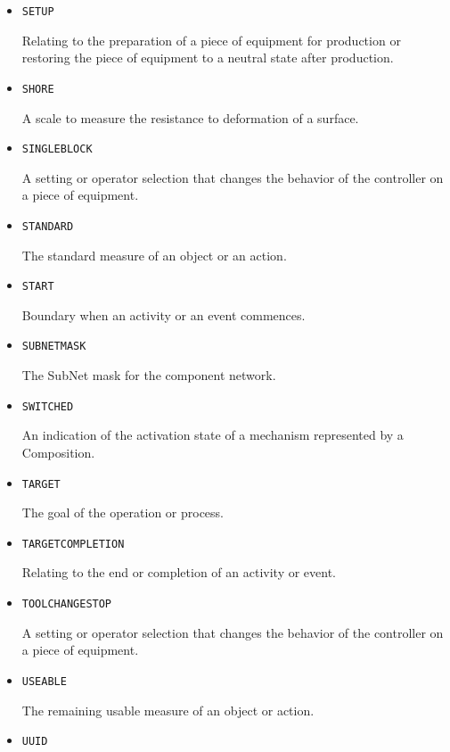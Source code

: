 \begin{itemize}
\item \texttt{SET\textunderscore UP}  

Relating to the preparation of a piece of equipment for production or restoring the piece of equipment to a neutral state after production.


\item \texttt{SHORE}  

A scale to measure the resistance to deformation of a surface.


\item \texttt{SINGLE\textunderscore BLOCK}  

A setting or operator selection that changes the behavior of the controller on a piece of equipment. 


\item \texttt{STANDARD}  

The standard measure of an object or an action.


\item \texttt{START}  

Boundary when an activity or an event commences.


\item \texttt{SUBNET\textunderscore MASK}  

The SubNet mask for the component network.



\item \texttt{SWITCHED}  

An indication of the activation state of a mechanism represented by a \gls{Composition}.


\item \texttt{TARGET}  

The goal of the operation or process.


\item \texttt{TARGET\textunderscore COMPLETION}  

Relating to the end or completion of an activity or event.


\item \texttt{TOOL\textunderscore CHANGE\textunderscore STOP}  

A setting or operator selection that changes the behavior of the controller on a piece of equipment.


\item \texttt{USEABLE}  

The remaining usable measure of an object or action.


\item \texttt{UUID}  


\end{itemize}
